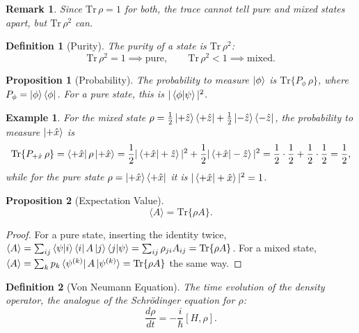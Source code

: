 \documentclass{article}
\newtheorem{definition}{Definition}
\newtheorem*{example}{Example}
\newtheorem{remark}{Remark}
\newtheorem{proposition}{Proposition}
\begin{document}
\begin{remark}
    Since $\text{Tr}\,\rho = 1$ for both, the trace cannot tell pure and mixed states apart, but $\text{Tr}\,\rho^2$ can.
\end{remark}
\begin{definition}[Purity]
    The purity of a state is $\text{Tr}\,\rho^2$:
    \begin{equation}
        \text{Tr}\,\rho^2 = 1 \implies \text{pure}, \qquad \text{Tr}\,\rho^2 < 1 \implies \text{mixed}.
    \end{equation}
\end{definition}
\begin{proposition}[Probability]
    The probability to measure $\ket{\phi}$ is $\text{Tr}\{P_\phi\,\rho\}$, where $P_\phi = \ket{\phi}\bra{\phi}$. For a pure state, this is $|\braket{\phi|\psi}|^2$.
\end{proposition}
\begin{example}
    For the mixed state $\rho = \frac{1}{2}\ket{+\hat{z}}\bra{+\hat{z}} + \frac{1}{2}\ket{-\hat{z}}\bra{-\hat{z}}$, the probability to measure $\ket{+\hat{x}}$ is
    \begin{equation*}
        \text{Tr}\{P_{+\hat{x}}\,\rho\} = \bra{+\hat{x}}\rho\ket{+\hat{x}} = \frac{1}{2}|\braket{+\hat{x}|+\hat{z}}|^2 + \frac{1}{2}|\braket{+\hat{x}|-\hat{z}}|^2 = \frac{1}{2}\cdot\frac{1}{2} + \frac{1}{2}\cdot\frac{1}{2} = \frac{1}{2},
    \end{equation*}
    while for the pure state $\rho = \ket{+\hat{x}}\bra{+\hat{x}}$ it is $|\braket{+\hat{x}|+\hat{x}}|^2 = 1$.
\end{example}
\begin{proposition}[Expectation Value]
    \begin{equation}
        \langle A\rangle = \text{Tr}\{\rho A\}.
    \end{equation}
\end{proposition}
\begin{proof}
    For a pure state, inserting the identity twice, $\langle A\rangle = \sum_{ij}\braket{\psi|i}\bra{i}A\ket{j}\braket{j|\psi} = \sum_{ij}\rho_{ji}A_{ij} = \text{Tr}\{\rho A\}$. For a mixed state, $\langle A\rangle = \sum_k p_k\bra{\psi^{(k)}}A\ket{\psi^{(k)}} = \text{Tr}\{\rho A\}$ the same way.
\end{proof}
\begin{definition}[Von Neumann Equation]
    The time evolution of the density operator, the analogue of the Schrödinger equation for $\rho$:
    \begin{equation}
        \frac{d\rho}{dt} = -\frac{i}{\hbar}[H, \rho].
    \end{equation}
\end{definition}
\end{document}
